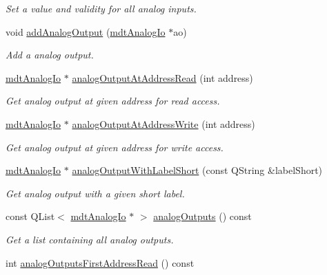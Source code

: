 \begin{DoxyCompactItemize}
\begin{DoxyCompactList}\small\item\em Set a value and validity for all analog inputs. \end{DoxyCompactList}\item 
void \hyperlink{classmdt_device_ios_aeed1140ed869866a6edc738d3b2a6d0b}{addAnalogOutput} (\hyperlink{classmdt_analog_io}{mdtAnalogIo} $\ast$ao)
\begin{DoxyCompactList}\small\item\em Add a analog output. \end{DoxyCompactList}\item 
\hyperlink{classmdt_analog_io}{mdtAnalogIo} $\ast$ \hyperlink{classmdt_device_ios_a74385f332753cedb68ae4133c97384be}{analogOutputAtAddressRead} (int address)
\begin{DoxyCompactList}\small\item\em Get analog output at given address for read access. \end{DoxyCompactList}\item 
\hyperlink{classmdt_analog_io}{mdtAnalogIo} $\ast$ \hyperlink{classmdt_device_ios_a968999a1021a96504805248e2ce04382}{analogOutputAtAddressWrite} (int address)
\begin{DoxyCompactList}\small\item\em Get analog output at given address for write access. \end{DoxyCompactList}\item 
\hyperlink{classmdt_analog_io}{mdtAnalogIo} $\ast$ \hyperlink{classmdt_device_ios_aab2b2b1f8c887eb9f439cf495ec95fbd}{analogOutputWithLabelShort} (const QString \&labelShort)
\begin{DoxyCompactList}\small\item\em Get analog output with a given short label. \end{DoxyCompactList}\item 
const QList$<$ \hyperlink{classmdt_analog_io}{mdtAnalogIo} $\ast$ $>$ \hyperlink{classmdt_device_ios_aa4ddc48f9e3258adc7222ef3481a518e}{analogOutputs} () const 
\begin{DoxyCompactList}\small\item\em Get a list containing all analog outputs. \end{DoxyCompactList}\item 
\hypertarget{classmdt_device_ios_a48b6a6c583dec30ccb1b782e79d14dbb}{
int \hyperlink{classmdt_device_ios_a48b6a6c583dec30ccb1b782e79d14dbb}{analogOutputsFirstAddressRead} () const }
\label{classmdt_device_ios_a48b6a6c583dec30ccb1b782e79d14dbb}


\end{DoxyCompactItemize}
